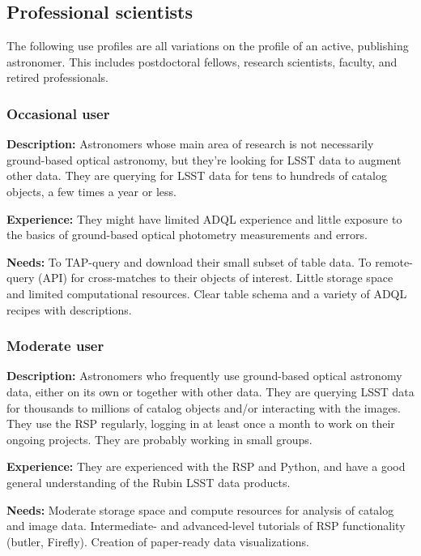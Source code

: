 \subsection{Professional scientists}

The following use profiles are all variations on the profile of an
active, publishing astronomer.
This includes postdoctoral fellows, research scientists, faculty, and
retired professionals. 

\subsubsection{Occasional user}

\textbf{Description:}
Astronomers whose main area of research is not necessarily ground-based
optical astronomy, but they're looking for LSST data to augment other data.
They are querying for LSST data for tens to hundreds of catalog objects, a few times 
a year or less.

\textbf{Experience:}
They might have limited ADQL experience and little exposure to the
basics of ground-based optical photometry measurements and errors.

\textbf{Needs:}
To TAP-query and download their small subset of table data.
To remote-query (API) for cross-matches to their objects of interest.
Little storage space and limited computational resources.
Clear table schema and a variety of ADQL recipes with descriptions.

\subsubsection{Moderate user}

\textbf{Description:}
Astronomers who frequently use ground-based optical astronomy data, either on its own
or together with other data.
They are querying LSST data for thousands to millions of catalog objects and/or
interacting with the images.
They use the RSP regularly, logging in at least once a month to work on their
ongoing projects.
They are probably working in small groups.

\textbf{Experience:}
They are experienced with the RSP and Python, and have a good general understanding
of the Rubin LSST data products.

\textbf{Needs:}
Moderate storage space and compute resources for analysis of catalog and image data.
Intermediate- and advanced-level tutorials of RSP functionality (butler, Firefly).
Creation of paper-ready data visualizations.

